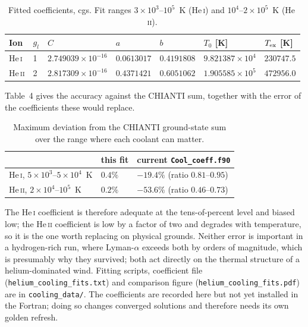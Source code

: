 \documentclass[english,a4paper]{my_memo}
\begin{document}
\begin{table}[h]
\centering
\small
\begin{tabular}{@{}lllllll@{}}
\toprule
Ion & $g_l$ & $C$ & $a$ & $b$ & $T_0$ [K] & $T_{\rm ex}$ [K] \\
\midrule
He\,\textsc{i}  & 1 & $2.749039\times10^{-16}$ & $0.0613017$ & $0.4191808$
                & $9.821387\times10^{4}$ & $230747.5$ \\
He\,\textsc{ii} & 2 & $2.817309\times10^{-16}$ & $0.4371421$ & $0.6051062$
                & $1.905585\times10^{5}$ & $472956.0$ \\
\bottomrule
\end{tabular}
\caption{Fitted coefficients, cgs. Fit ranges $3\times10^3$--$10^5$~K
(He\,\textsc{i}) and $10^4$--$2\times10^5$~K (He\,\textsc{ii}).}
\end{table}

Table~4 gives the accuracy against the CHIANTI sum, together with the error
of the coefficients these would replace.

\begin{table}[h]
\centering
\small
\begin{tabular}{@{}lll@{}}
\toprule
 & this fit & current \texttt{Cool\_coeff.f90} \\
\midrule
He\,\textsc{i}, $5\times10^3$--$5\times10^4$~K
  & $0.4\%$ & $-19.4\%$ (ratio $0.81$--$0.95$) \\
He\,\textsc{ii}, $2\times10^4$--$10^5$~K
  & $0.2\%$ & $-53.6\%$ (ratio $0.46$--$0.73$) \\
\bottomrule
\end{tabular}
\caption{Maximum deviation from the CHIANTI ground-state sum over the range
where each coolant can matter.}
\end{table}

The He\,\textsc{i} coefficient is therefore adequate at the tens-of-percent
level and biased low; the He\,\textsc{ii} coefficient is low by a factor of
two and degrades with temperature, so it is the one worth replacing on
physical grounds. Neither error is important in a hydrogen-rich run, where
Lyman-$\alpha$ exceeds both by orders of magnitude, which is presumably why
they survived; both act directly on the thermal structure of a
helium-dominated wind. Fitting scripts, coefficient file
(\texttt{helium\_cooling\_fits.txt}) and comparison figure
(\texttt{helium\_cooling\_fits.pdf}) are in \texttt{cooling\_data/}. The
coefficients are recorded here but not yet installed in the Fortran; doing so
changes converged solutions and therefore needs its own golden refresh.
\end{document}
